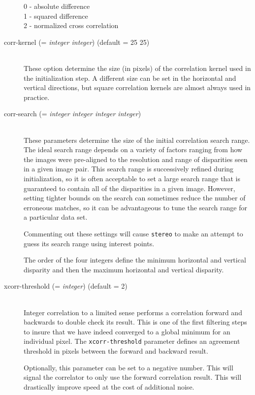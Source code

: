 \begin{description}
  \begin{description}
    \item[0 - absolute difference]
    \item[1 - squared difference]
    \item[2 - normalized cross correlation]
  \end{description}

\item[corr-kernel \textnormal{\small{(= \emph{integer integer})}} (default = 25 25)] \hfill \\
  These option determine the size (in pixels) of the correlation
  kernel used in the initialization step.  A different size can be set
  in the horizontal and vertical directions, but square correlation
  kernels are almost always used in practice.

\item[corr-search \textnormal{\small{(= \emph{integer integer integer integer})}}] \hfill \\
  These parameters determine the size of the initial correlation
  search range.  The ideal search range depends on a variety of
  factors ranging from how the images were pre-aligned to the
  resolution and range of disparities seen in a given image pair.
  This search range is successively refined during initialization, so
  it is often acceptable to set a large search range that is guaranteed
  to contain all of the disparities in a given image.  However,
  setting tighter bounds on the search can sometimes reduce the number
  of erroneous matches, so it can be advantageous to tune the
  search range for a particular data set.

  Commenting out these settings will cause \texttt{stereo} to make an
  attempt to guess its search range using interest points.

  The order of the four integers define the minimum horizontal and
  vertical disparity and then the maximum horizontal and vertical
  disparity.

\item[xcorr-threshold \textnormal{\small{(= \emph{integer})}} (default = 2)] \hfill \\

  Integer correlation to a limited sense performs a correlation
  forward and backwards to double check its result. This is one of the
  first filtering steps to insure that we have indeed converged to a
  global minimum for an individual pixel. The \texttt{xcorr-threshold}
  parameter defines an agreement threshold in pixels between the
  forward and backward result.

  Optionally, this parameter can be set to a negative number. This
  will signal the correlator to only use the forward correlation
  result. This will drastically improve speed at the cost of
  additional noise.

\end{description}

